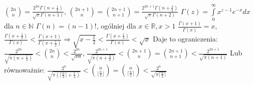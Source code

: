 \documentclass{pracamgr}
\begin{document}
   \begin{spacing}{2}
   \noindent
    ${2n \choose n}=\frac{2^{2n}\Gamma(n+\frac{1}{2})}{\sqrt{\pi}\Gamma(n+1)}$,\quad\quad
    ${2n+1 \choose n}={2n+1 \choose n+1}=\frac{2^{2n+1}\Gamma(n+\frac{3}{2})}{\sqrt{\pi}\Gamma(n+2)}$\newline
    $\Gamma(z)=\int\limits_{0}^{\infty}x^{z-1}e^{-x}dx$\quad
    dla $n\in\mathbb{N}$ $\Gamma(n)=(n-1)!$,\newline
    ogólniej dla $x\in\mathbb{R},x>1$ $\frac{\Gamma(x+1)}{\Gamma(x)}=x$,\quad\quad
    $\frac{\Gamma(x+\frac{1}{2})}{\Gamma(x)}<\frac{\Gamma(x+1)}{\Gamma(x+\frac{1}{2})}\Rightarrow
    \sqrt{x-\frac{1}{2}}<\frac{\Gamma(x+\frac{1}{2})}{\Gamma(x)}<\sqrt{x}$\newline
    Daje to ograniczenia:
    $\frac{2^{2n}}{\sqrt{\pi(n+\frac{1}{2})}}<{2n\choose n}<\frac{2^{2n}}{\sqrt{\pi n}}$,\quad\quad
    $\frac{2^{2n+1}}{\sqrt{\pi(n+\frac{3}{2})}}<{2n+1\choose n}={2n+1\choose n+1}<\frac{2^{2n+1}}{\sqrt{\pi(n+1)}}$\newline
    Lub równoważnie:
    $\frac{2^n}{\sqrt{\pi(\lceil\frac{n}{2}\rceil+\frac{1}{2})}}<{n\choose\lfloor\frac{n}{2}\rfloor}
    ={n\choose\lceil\frac{n}{2}\rceil}<\frac{2^n}{\sqrt{\pi\lceil\frac{n}{2}\rceil}}$
   \end{spacing}
\end{document}
